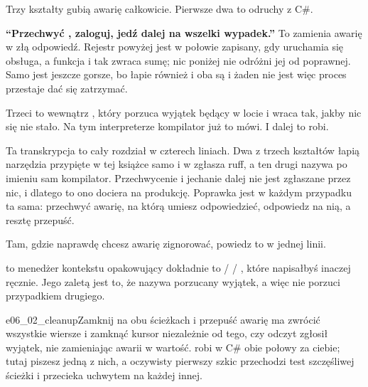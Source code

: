 \noindent
Trzy kształty gubią awarię całkowicie. Pierwsze dwa to odruchy z C\#.


\begin{trapbox}
\textbf{\enquote{Przechwyć , zaloguj, jedź dalej \dash{} na
wszelki wypadek.}}
To zamienia awarię w złą odpowiedź. Rejestr powyżej jest w połowie zapisany,
gdy uruchamia się obsługa, a funkcja i tak zwraca sumę; nic poniżej nie odróżni
jej od poprawnej. Samo  jest jeszcze gorsze, bo łapie również
 i  \dash{} oba są
 i żaden nie jest  \dash{} więc proces
przestaje dać się zatrzymać.
\end{trapbox}

\noindent
Trzeci to  wewnątrz , który porzuca wyjątek będący
w locie i wraca tak, jakby nic się nie stało. Na tym interpreterze kompilator
już to mówi. I dalej to robi.


\noindent
Ta transkrypcja to cały rozdział w czterech liniach. Dwa z trzech kształtów
łapią narzędzia przypięte w tej książce \dash{} samo  i
 w  zgłasza ruff, a ten drugi nazywa po imieniu sam
kompilator. Przechwycenie  i jechanie dalej nie jest zgłaszane
przez nic, i dlatego to ono dociera na produkcję. Poprawka jest w każdym
przypadku ta sama: przechwyć awarię, na którą umiesz odpowiedzieć, odpowiedz
na nią, a resztę przepuść.


\noindent
Tam, gdzie naprawdę chcesz awarię zignorować, powiedz to w jednej linii.

\noindent
{} to menedżer kontekstu opakowujący dokładnie to
 /  / , które napisałbyś inaczej ręcznie.
Jego zaletą jest to, że nazywa porzucany wyjątek, a więc nie porzuci
przypadkiem drugiego.

\begin{exercise}{e06_02_cleanup}{Zamknij na obu ścieżkach i przepuść awarię}
 ma zwrócić wszystkie wiersze i zamknąć kursor niezależnie od
tego, czy odczyt zgłosił wyjątek, nie zamieniając awarii w wartość.
 robi w C\# obie połowy za ciebie; tutaj piszesz jedną z nich, a
oczywisty pierwszy szkic przechodzi test szczęśliwej ścieżki i przecieka
uchwytem na każdej innej.
\end{exercise}

